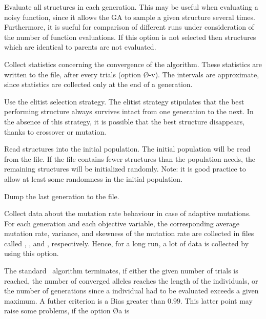 \begin{Enumerate}
%
\item	{} 
	Evaluate all structures in each generation.   
	This may  be  useful  when  evaluating a noisy function, since it
       	allows the GA to sample a given structure several times.  
	Furthermore, it is sueful for comparison of different runs under
	consideration of the number of function evaluations.
	If this option is not selected then structures which are identical 
	to parents are not evaluated.
%
\item	{}
	Collect statistics concerning the  convergence  of
       	the  algorithm.   
	These  statistics are written to the  file, 
	after every  trials (option \O{-v}).   
	The  intervals are  approximate, since statistics are 
	collected only at the end of a generation.  
%
\item	{}
	Use the elitist selection strategy.  
	The elitist strategy  stipulates  that  the  best  
	performing  structure always survives intact from one 
	generation to the next.   
	In the  absence  of this strategy, it is possible that 
	the best structure disappears, thanks to crossover or mutation.
%
\item	{}
	Read structures into the initial population.   
	The initial  population  will  be read from the  file.  
	If the file  contains  fewer  structures  than  the  population
       	needs,  the  remaining  structures  will be initialized randomly.  
	Note: it is good practice to  allow  at  least  some
       	randomness in the initial population.
%
\item	{}
	Dump the last generation to the  file.  
%
\item	{}
	Collect data about the mutation rate behaviour in case of adaptive
	mutations.
	For each generation and each objective variable, the corresponding
	average mutation rate, variance, and skewness of the mutation rate
	are collected in files called , , and 
	, respectively.
	Hence, for a long run, a lot of data is collected by using
	this option.
%
\item	{}
	The standard \GEN\ algorithm terminates, if either the
	given number of trials is reached, the number of converged alleles 
	reaches the length of the individuals, or the number of 
	generations since a individual had to be evaluated exceeds a 
	given maximum. 
	A futher criterion is a Bias greater than $0.99$. 
	This latter point may raise some problems, if the option \O{a} is 

\end{Enumerate}
